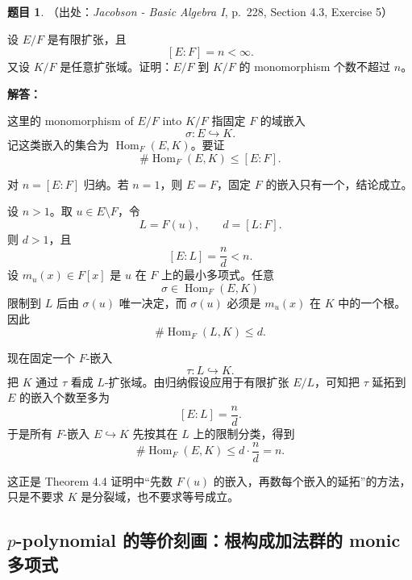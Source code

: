 \documentclass[a4paper]{ctexart}
\theoremstyle{definition}
\newtheorem{example}{题目}[section]
\theoremstyle{analysis}
\theoremstyle{plain}
\begin{document}
\begin{example}
（出处：\textit{Jacobson - Basic Algebra I}, p.~228, Section 4.3, Exercise 5）

设 \(E/F\) 是有限扩张，且
\[
  [E:F]=n<\infty.
\]
又设 \(K/F\) 是任意扩张域。证明：\(E/F\) 到 \(K/F\) 的 monomorphism 个数不超过 \(n\)。

\textbf{解答：}

这里的 monomorphism of \(E/F\) into \(K/F\) 指固定 \(F\) 的域嵌入
\[
  \sigma:E\hookrightarrow K.
\]
记这类嵌入的集合为 \(\operatorname{Hom}_F(E,K)\)。要证
\[
  \#\operatorname{Hom}_F(E,K)\le [E:F].
\]

对 \(n=[E:F]\) 归纳。若 \(n=1\)，则 \(E=F\)，固定 \(F\) 的嵌入只有一个，结论成立。

设 \(n>1\)。取 \(u\in E\setminus F\)，令
\[
  L=F(u),\qquad d=[L:F].
\]
则 \(d>1\)，且
\[
  [E:L]=\frac{n}{d}<n.
\]
设 \(m_u(x)\in F[x]\) 是 \(u\) 在 \(F\) 上的最小多项式。任意
\[
  \sigma\in \operatorname{Hom}_F(E,K)
\]
限制到 \(L\) 后由 \(\sigma(u)\) 唯一决定，而 \(\sigma(u)\) 必须是 \(m_u(x)\) 在 \(K\) 中的一个根。因此
\[
  \#\operatorname{Hom}_F(L,K)\le d.
\]

现在固定一个 \(F\)-嵌入
\[
  \tau:L\hookrightarrow K.
\]
把 \(K\) 通过 \(\tau\) 看成 \(L\)-扩张域。由归纳假设应用于有限扩张 \(E/L\)，可知把 \(\tau\) 延拓到 \(E\) 的嵌入个数至多为
\[
  [E:L]=\frac{n}{d}.
\]
于是所有 \(F\)-嵌入 \(E\hookrightarrow K\) 先按其在 \(L\) 上的限制分类，得到
\[
  \#\operatorname{Hom}_F(E,K)
  \le
  d\cdot \frac{n}{d}
  =
  n.
\]

这正是 Theorem 4.4 证明中“先数 \(F(u)\) 的嵌入，再数每个嵌入的延拓”的方法，只是不要求 \(K\) 是分裂域，也不要求等号成立。
\end{example}

\subsection{\texorpdfstring{$p$-polynomial 的等价刻画：根构成加法群的 monic 多项式}{p-polynomial 的等价刻画}}\label{subsec:problem-p-polynomial}
\end{document}
